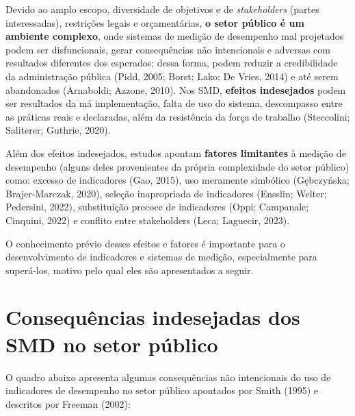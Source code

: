 \documentclass[
  letterpaper,
  DIV=11,
  numbers=noendperiod]{scrreprt}
\begin{document}
Devido ao amplo escopo, diversidade de objetivos e de
\emph{stakeholders} (partes interessadas), restrições legais e
orçamentárias, \textbf{o setor público é um ambiente complexo}, onde
sistemas de medição de desempenho mal projetados podem ser
disfuncionais, gerar consequências não intencionais e adversas com
resultados diferentes dos esperados; dessa forma, podem reduzir a
credibilidade da administração pública (Pidd, 2005; Borst; Lako; De
Vries, 2014) e até serem abandonados (Arnaboldi; Azzone, 2010). Nos SMD,
\textbf{efeitos indesejados} podem ser resultados da má implementação,
falta de uso do sistema, descompasso entre as práticas reais e
declaradas, além da resistência da força de trabalho (Steccolini;
Saliterer; Guthrie, 2020).

Além dos efeitos indesejados, estudos apontam \textbf{fatores
limitantes} à medição de desempenho (alguns deles provenientes da
própria complexidade do setor público) como: excesso de indicadores
(Gao, 2015), uso meramente simbólico (Gębczyńska; Brajer-Marczak, 2020),
seleção inapropriada de indicadores (Ensslin; Welter; Pedersini, 2022),
substituição precoce de indicadores (Oppi; Campanale; Cinquini, 2022) e
conflito entre stakeholders (Leca; Laguecir, 2023).

O conhecimento prévio desses efeitos e fatores é importante para o
desenvolvimento de indicadores e sistemas de medição, especialmente para
superá-los, motivo pelo qual eles são apresentados a seguir.

\hypertarget{consequuxeancias-indesejadas-dos-smd-no-setor-puxfablico}{%
\section{Consequências indesejadas dos SMD no setor
público}\label{consequuxeancias-indesejadas-dos-smd-no-setor-puxfablico}}

O quadro abaixo apresenta algumas consequências não intencionais do uso
de indicadores de desempenho no setor público apontados por Smith (1995)
e descritos por Freeman (2002):
\end{document}
